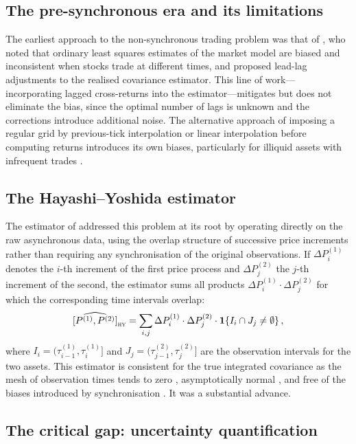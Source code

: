 \documentclass[reqno, 12pt]{amsart}
\newcommand{\HY}{\textsc{hy}}
\theoremstyle{plain}
\theoremstyle{definition}
\theoremstyle{remark}
\begin{document}
\subsection{The pre-synchronous era and its limitations}

The earliest approach to the non-synchronous trading problem was that
of \citet{scholes1977}, who noted that ordinary least squares estimates
of the market model are biased and inconsistent when stocks trade at
different times, and proposed lead-lag adjustments to the realised
covariance estimator. This line of work---incorporating lagged
cross-returns into the estimator---mitigates but does not eliminate
the bias, since the optimal number of lags is unknown and the
corrections introduce additional noise. The alternative approach of
imposing a regular grid by previous-tick interpolation or linear
interpolation before computing returns introduces its own biases,
particularly for illiquid assets with infrequent trades
\citep{barndorff2011}.

\subsection{The Hayashi--Yoshida estimator}

The estimator of \citet{hayashi2005} addressed this problem at its
root by operating directly on the raw asynchronous data, using the
overlap structure of successive price increments rather than requiring
any synchronisation of the original observations. If $\Delta P^{(1)}_i$
denotes the $i$-th increment of the first price process and
$\Delta P^{(2)}_j$ the $j$-th increment of the second, the estimator
sums all products $\Delta P^{(1)}_i \cdot \Delta P^{(2)}_j$ for which
the corresponding time intervals overlap:
\begin{equation}
  \widehat{[P^{(1)},P^{(2)}]}_{\HY}
  = \sum_{i,j} \Delta P^{(1)}_i \cdot \Delta P^{(2)}_j
    \cdot \mathbf{1}\!\left\{I_i \cap J_j \neq \emptyset\right\},
  \label{eq:HY}
\end{equation}
where $I_i = (\tau^{(1)}_{i-1}, \tau^{(1)}_i]$ and
$J_j = (\tau^{(2)}_{j-1}, \tau^{(2)}_j]$ are the observation intervals
for the two assets. This estimator is consistent for the true
integrated covariance as the mesh of observation times tends to zero
\citep{hayashi2005}, asymptotically normal \citep{hayashi2008}, and
free of the biases introduced by synchronisation \citep{griffin2011}.
It was a substantial advance.

\subsection{The critical gap: uncertainty quantification}
\end{document}
